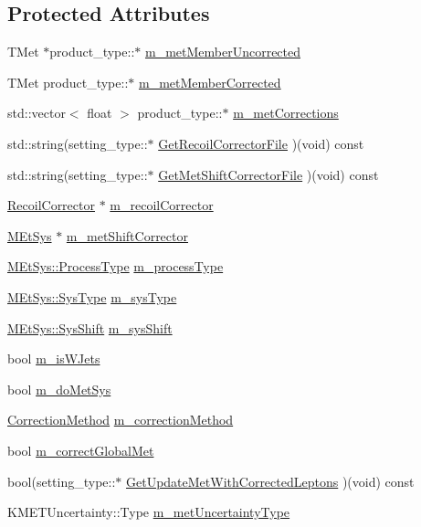\subsection*{Protected Attributes}
\begin{DoxyCompactItemize}
\item 
TMet $\ast$product\_\-type::$\ast$ \hyperlink{classMetCorrectorBase_adad757ee9377e76716ccc0a112e1de20}{m\_\-metMemberUncorrected}
\item 
TMet product\_\-type::$\ast$ \hyperlink{classMetCorrectorBase_a12111218c46fcb7d0076b3eb68723c2e}{m\_\-metMemberCorrected}
\item 
std::vector$<$ float $>$ product\_\-type::$\ast$ \hyperlink{classMetCorrectorBase_a5f393c3c3de785b48c88fdb4068d78ee}{m\_\-metCorrections}
\item 
std::string(setting\_\-type::$\ast$ \hyperlink{classMetCorrectorBase_ab75acb883f87b203f02497a8ac1d9612}{GetRecoilCorrectorFile} )(void) const 
\item 
std::string(setting\_\-type::$\ast$ \hyperlink{classMetCorrectorBase_ae8439b8b315c598df5771d88cd245a49}{GetMetShiftCorrectorFile} )(void) const 
\item 
\hyperlink{classRecoilCorrector}{RecoilCorrector} $\ast$ \hyperlink{classMetCorrectorBase_a5b1690be919bde47dcfd8f5d5be781c8}{m\_\-recoilCorrector}
\item 
\hyperlink{classMEtSys}{MEtSys} $\ast$ \hyperlink{classMetCorrectorBase_a5ca29fccc54b4183b2cf73a4e0183abe}{m\_\-metShiftCorrector}
\item 
\hyperlink{classMEtSys_afab2b6468da059ee0d9c8471ea7e7018}{MEtSys::ProcessType} \hyperlink{classMetCorrectorBase_a2ac16c2b3fcfddb16098eea641d506c3}{m\_\-processType}
\item 
\hyperlink{classMEtSys_ade79c833dae227147e7a69c89b190cb1}{MEtSys::SysType} \hyperlink{classMetCorrectorBase_addd0772673419e699b040fe06cc6db74}{m\_\-sysType}
\item 
\hyperlink{classMEtSys_ab7a2f541cbd603695f3fdf6c52f826b3}{MEtSys::SysShift} \hyperlink{classMetCorrectorBase_aaf1ddd88ab9c9070e006cf6d69ce1ca6}{m\_\-sysShift}
\item 
bool \hyperlink{classMetCorrectorBase_af0c8f314b82074900251d273fbabba12}{m\_\-isWJets}
\item 
bool \hyperlink{classMetCorrectorBase_a198e2c6d4ab350166b2a3ef2da7fef07}{m\_\-doMetSys}
\item 
\hyperlink{classMetCorrectorBase_a37bb26e946b22f52f1f358c7dd0bedfa}{CorrectionMethod} \hyperlink{classMetCorrectorBase_a645b5d5383e8faeaa831f1920e5b4665}{m\_\-correctionMethod}
\item 
bool \hyperlink{classMetCorrectorBase_a83e63d8cf10b1729d0b52bc400051ab3}{m\_\-correctGlobalMet}
\item 
bool(setting\_\-type::$\ast$ \hyperlink{classMetCorrectorBase_a9ee54f0240f3285b68a6a8290618cfad}{GetUpdateMetWithCorrectedLeptons} )(void) const 
\item 
KMETUncertainty::Type \hyperlink{classMetCorrectorBase_ae43982fe34cd695eaa6faca8ebbb75b0}{m\_\-metUncertaintyType}
\end{DoxyCompactItemize}


